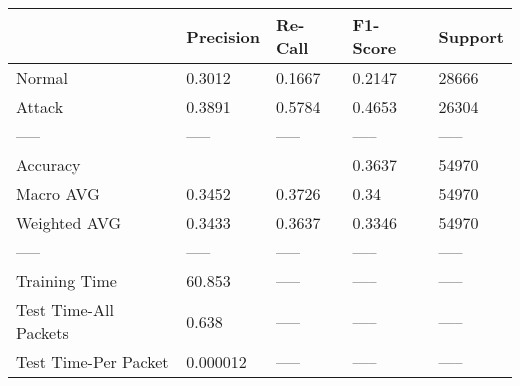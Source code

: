 \begin{tabular}{lllll}
\toprule
{} & Precision & Re-Call & F1-Score & Support \\
\midrule
Normal                &    0.3012 &  0.1667 &   0.2147 &   28666 \\
Attack                &    0.3891 &  0.5784 &   0.4653 &   26304 \\
-----                 &     ----- &   ----- &    ----- &   ----- \\
Accuracy              &           &         &   0.3637 &   54970 \\
Macro AVG             &    0.3452 &  0.3726 &     0.34 &   54970 \\
Weighted AVG          &    0.3433 &  0.3637 &   0.3346 &   54970 \\
-----                 &     ----- &   ----- &    ----- &   ----- \\
Training Time         &    60.853 &   ----- &    ----- &   ----- \\
Test Time-All Packets &     0.638 &   ----- &    ----- &   ----- \\
Test Time-Per Packet  &  0.000012 &   ----- &    ----- &   ----- \\
\bottomrule
\end{tabular}
